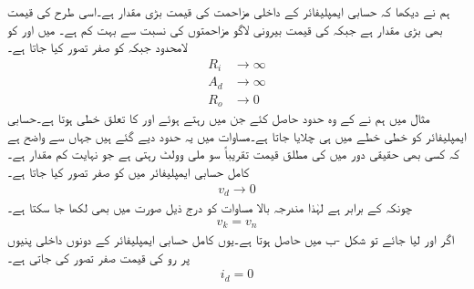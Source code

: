 ہم نے دیکھا کہ حسابی ایمپلیفائر کے داخلی مزاحمت  کی قیمت بڑی مقدار ہے۔اسی طرح  کی قیمت بھی بڑی مقدار ہے جبکہ  کی قیمت بیرونی لاگو مزاحمتوں کی نسبت سے بہت کم ہے۔ میں  اور  کو لامحدود جبکہ  کو صفر  تصور کیا جاتا ہے۔
\begin{align}
R_i& \to \infty \label{مساوات_حسابی_کامل_شرط_الف}\\
A_d& \to \infty  \label{مساوات_حسابی_کامل_شرط_ب}\\
R_o& \to 0  \label{مساوات_حسابی_کامل_شرط_پ}
\end{align}
مثال  میں ہم نے  کے وہ حدود حاصل کئے جن میں رہتے ہوئے  اور  کا تعلق خطی ہوتا ہے۔حسابی ایمپلیفائر کو خطی خطے میں ہی چلایا جاتا ہے۔مساوات  میں یہ حدود دیے گئے ہیں جہاں سے واضح ہے کہ کسی بھی حقیقی دور میں   کی مطلق قیمت تقریباً سو ملی وولٹ رہتی ہے جو نہایت کم مقدار ہے۔کامل حسابی ایمپلیفائر میں  کو صفر تصور کیا جاتا ہے۔
\begin{align}\label{مساوات_حسابی_کامل_شرط_ت}
v_d \to 0  
\end{align}
چونکہ  کے برابر ہے لہٰذا مندرجہ بالا مساوات کو درج ذیل صورت میں بھی لکھا جا سکتا ہے۔
\begin{align}\label{مساوات_حسابی_کامل_شرط_ٹ}
v_k=v_n
\end{align}
اگر  اور {} لیا جائے تو شکل -ب میں  حاصل ہوتا ہے۔یوں کامل حسابی ایمپلیفائر کے دونوں داخلی پنیوں پر رو کی قیمت صفر تصور کی جاتی ہے۔
\begin{align}\label{مساوات_حسابی_کامل_شرط_ث}
i_d=0
\end{align}

